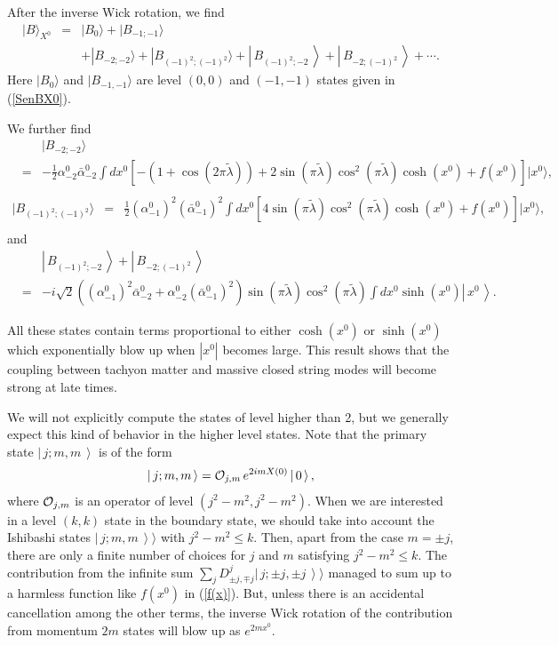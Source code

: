 \documentclass[a4paper,12pt]{article} \textheight=8.5truein
\newcommand{\ket}[1]{\left|\, #1\,\right\rangle}
\begin{document}
After the inverse Wick rotation, we find
\begin{eqnarray}
  |B\rangle_{X^0} &=&
|B_{0}\rangle+
|B_{-1;-1}\rangle\nonumber\\
&&+|B_{-2;-2}\rangle+|B_{(-1)^2;(-1)^2}\rangle
+\ket{B_{(-1)^2;-2}}+\ket{B_{-2;(-1)^2}}+\cdots.
\end{eqnarray}
Here $|B_{0}\rangle$ and $|B_{-1,-1}\rangle$
are level $(0,0)$ and $(-1,-1)$ states given in (\ref{SenBX0}).

We further find
\begin{eqnarray}
 && |B_{-2;-2}\rangle\nonumber\\
&=&-\frac{1}{2}\alpha^0_{-2}\bar{\alpha}^0_{-2}\int dx^0
\left[-(1+\cos(2\pi\tilde{\lambda}))
+2\sin(\pi\tilde{\lambda})\cos^2(\pi\tilde{\lambda})\cosh(x^0)
+f(x^0)
\right]|x^0\rangle,\nonumber
\\
\label{22}
\end{eqnarray}
\begin{eqnarray}
 |B_{(-1)^2;(-1)^2}\rangle
&=&\frac{1}{2}(\alpha^0_{-1})^2(\bar{\alpha}^0_{-1})^2\int dx^0
\left[
4\sin(\pi\tilde{\lambda}) \cos^2(\pi \tilde{\lambda}) \cosh(x^0)
+f(x^0)
\right]|x^0\rangle,\nonumber\\
\label{11}
\end{eqnarray}
and
\begin{eqnarray}
&&\ket{B_{(-1)^2;-2}}+\ket{B_{-2;(-1)^2}}\nonumber\\
&=&-i\sqrt{2}((\alpha_{-1}^0)^2\bar\alpha_{-2}^0
+\alpha_{-2}^0(\bar\alpha_{-1}^0)^2)
\sin(\pi\tilde\lambda)\cos^2(\pi\tilde\lambda)
\int dx^0\sinh(x^0)\ket{x^0}.
\label{12}
\end{eqnarray}

All these states contain terms proportional to either $\cosh(x^0)$
or $\sinh(x^0)$ which exponentially blow up when $|x^0|$ becomes
large. This result shows that the coupling between tachyon matter
and massive closed string modes will become strong at late times.

We will not explicitly compute the states of level higher than 2,
but we generally expect this kind of behavior
in the higher level states.
Note that the primary state $\ket{j;m,m}$ is of the form
\begin{eqnarray}
\ket{j;m,m}={\cal O}_{j,m}\,e^{2imX(0)}\ket{0},
\end{eqnarray}
where ${\cal O}_{j,m}$ is an operator of level
$(j^2-m^2,j^2-m^2)$. When we are interested in a level $(k,k)$
state in the boundary state, we should take into account the
Ishibashi states $\ket{j;m,m}\rangle$ with $j^2-m^2\le k$. Then,
apart from the case $m=\pm j$, there are only a finite number of
choices for $j$ and $m$ satisfying $j^2-m^2\le k$. The
contribution from the infinite sum $\sum_j D_{\pm j,\mp
j}^j\ket{j;\pm j,\pm j}\rangle$ managed to sum up to a harmless
function like $f(x^0)$ in (\ref{f(x)}). But, unless there is an
accidental cancellation among the other terms, the inverse Wick
rotation of the contribution from momentum $2m$ states will blow
up as $e^{2m x^0}$.
\end{document}
